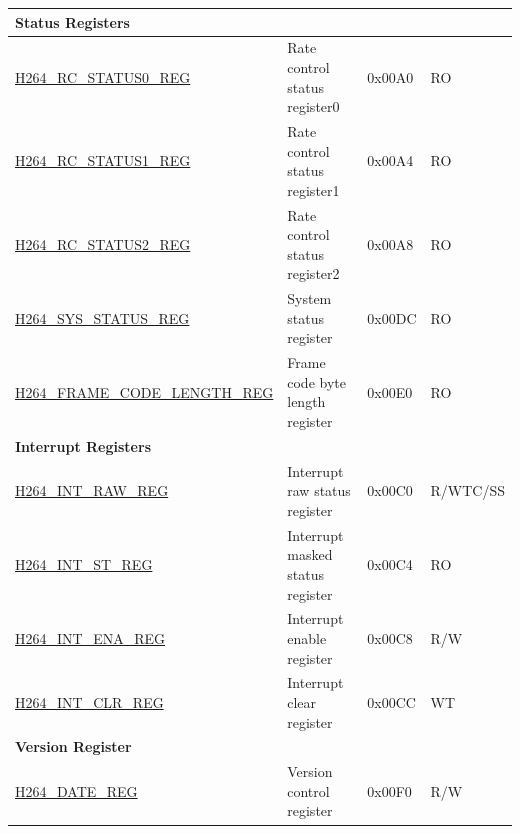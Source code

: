 \begin{longtable}{ | p{7cm} | p{6.2cm} | p{1.2cm} | p{1cm} | }
\multicolumn{4}{|l|}{\textbf{Status Registers}} \\ \hline
\hyperref[regdesc:H264RCSTATUS0REG]{H264\_RC\_STATUS0\_REG} & Rate control status register0 & 0x00A0 & RO \\ \hline
\hyperref[regdesc:H264RCSTATUS1REG]{H264\_RC\_STATUS1\_REG} & Rate control status register1 & 0x00A4 & RO \\ \hline
\hyperref[regdesc:H264RCSTATUS2REG]{H264\_RC\_STATUS2\_REG} & Rate control status register2 & 0x00A8 & RO \\ \hline
\hyperref[regdesc:H264SYSSTATUSREG]{H264\_SYS\_STATUS\_REG} & System status register & 0x00DC & RO \\ \hline
\hyperref[regdesc:H264FRAMECODELENGTHREG]{H264\_FRAME\_CODE\_LENGTH\_REG} & Frame code byte length register & 0x00E0 & RO \\ \hline
\multicolumn{4}{|l|}{\textbf{Interrupt Registers}} \\ \hline
\hyperref[regdesc:H264INTRAWREG]{H264\_INT\_RAW\_REG} & Interrupt raw status register & 0x00C0 & R/WTC/SS \\ \hline
\hyperref[regdesc:H264INTSTREG]{H264\_INT\_ST\_REG} & Interrupt masked status register & 0x00C4 & RO \\ \hline
\hyperref[regdesc:H264INTENAREG]{H264\_INT\_ENA\_REG} & Interrupt enable register & 0x00C8 & R/W \\ \hline
\hyperref[regdesc:H264INTCLRREG]{H264\_INT\_CLR\_REG} & Interrupt clear register & 0x00CC & WT \\ \hline
\multicolumn{4}{|l|}{\textbf{Version Register}} \\ \hline
\hyperref[regdesc:H264DATEREG]{H264\_DATE\_REG} & Version control register & 0x00F0 & R/W \\ \hline
\end{longtable}
